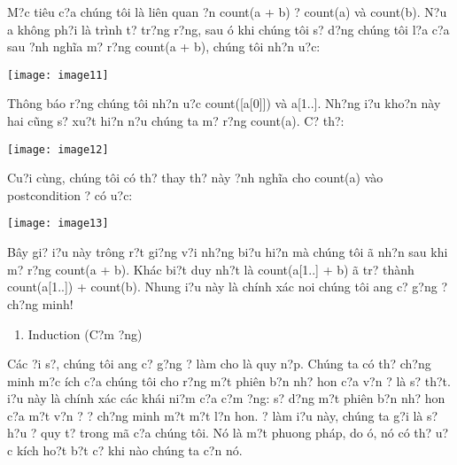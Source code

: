 \documentclass{article} %
\begin{document}
M?c ti\^{e}u c?a ch\'{u}ng t\^{o}i l\`{a} li\^{e}n quan {\dj}?n count(a + b) {\dj}? count(a) v\`{a} count(b). N?u a kh\^{o}ng ph?i l\`{a} tr\`{i}nh t? tr?ng r?ng, sau {\dj}\'{o} khi ch\'{u}ng t\^{o}i s? d?ng ch\'{u}ng t\^{o}i l?a c?a sau {\dj}?nh ngh\~{i}a m? r?ng count(a + b), ch\'{u}ng t\^{o}i nh?n {\dj}u?c:

\noindent \texttt{[image: image11]}

Th\^{o}ng b\'{a}o r?ng ch\'{u}ng t\^{o}i nh?n {\dj}u?c count([a[0]]) v\`{a} a[1..]. Nh?ng {\dj}i?u kho?n n\`{a}y hai c\~{u}ng s? xu?t hi?n n?u ch\'{u}ng ta m? r?ng count(a). C? th?:

\noindent \texttt{[image: image12]}

Cu?i c\`{u}ng, ch\'{u}ng t\^{o}i c\'{o} th? thay th? n\`{a}y {\dj}?nh ngh\~{i}a cho count(a) v\`{a}o postcondition {\dj}? c\'{o} {\dj}u?c:

\noindent \texttt{[image: image13]}

B\^{a}y gi? {\dj}i?u n\`{a}y tr\^{o}ng r?t gi?ng v?i nh?ng bi?u hi?n m\`{a} ch\'{u}ng t\^{o}i {\dj}\~{a} nh?n sau khi m? r?ng count(a + b). Kh\'{a}c bi?t duy nh?t l\`{a} count(a[1..] + b) {\dj}\~{a} tr? th\`{a}nh count(a[1..]) + count(b). Nhung {\dj}i?u n\`{a}y l\`{a} ch\'{i}nh x\'{a}c noi ch\'{u}ng t\^{o}i {\dj}ang c? g?ng {\dj}? ch?ng minh!

\begin{enumerate}
\item  Induction (C?m ?ng)
\end{enumerate}

C\'{a}c {\dj}?i s?, ch\'{u}ng t\^{o}i {\dj}ang c? g?ng {\dj}? l\`{a}m cho l\`{a} quy n?p. Ch\'{u}ng ta c\'{o} th? ch?ng minh m?c {\dj}\'{i}ch c?a ch\'{u}ng t\^{o}i cho r?ng m?t phi\^{e}n b?n nh? hon c?a v?n {\dj}? l\`{a} s? th?t. {\DJ}i?u n\`{a}y l\`{a} ch\'{i}nh x\'{a}c c\'{a}c kh\'{a}i ni?m c?a c?m ?ng: s? d?ng m?t phi\^{e}n b?n nh? hon c?a m?t v?n {\dj}? {\dj}? ch?ng minh m?t m?t l?n hon. {\DJ}? l\`{a}m {\dj}i?u n\`{a}y, ch\'{u}ng ta g?i l\`{a} s? h?u {\dj}? quy t? trong m\~{a} c?a ch\'{u}ng t\^{o}i. N\'{o} l\`{a} m?t phuong ph\'{a}p, do {\dj}\'{o}, n\'{o} c\'{o} th? {\dj}u?c k\'{i}ch ho?t b?t c? khi n\`{a}o ch\'{u}ng ta c?n n\'{o}.
\end{document}
